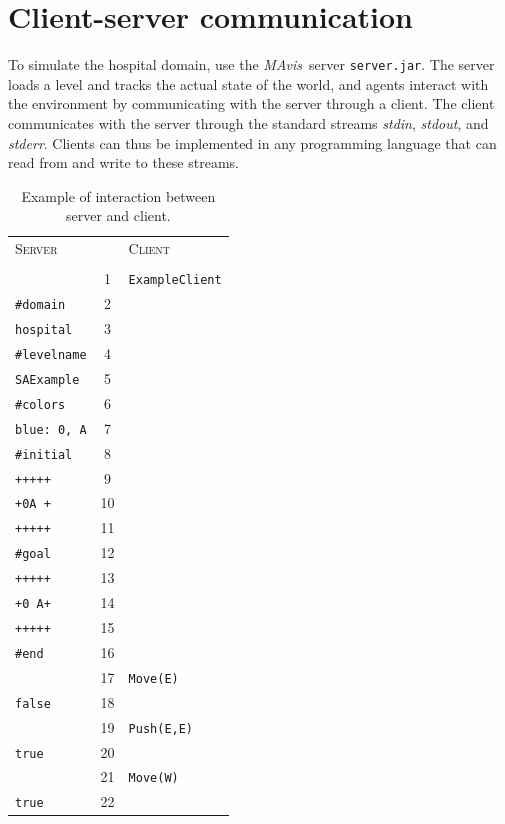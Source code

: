\documentclass[12pt,a4paper]{article}
\def\mavis{{\itshape MAvis}}
\begin{document}
\section{Client-server communication}\label{sect:env}


To simulate the hospital domain, use the \mavis\ server \texttt{server.jar}. The server loads a level and tracks the actual state of the world, and agents interact with the environment by communicating with the server through a client. The client communicates with the server through the standard streams \emph{stdin}, \emph{stdout}, and \emph{stderr}. Clients can thus be implemented in any programming language that can read from and write to these streams.

\begin{table}
\centering \setlength{\tabcolsep}{1cm} 
\begin{tabular}{lcl} 
\textsc{Server} &    & \textsc{Client}\\ \\
& 1 & \texttt{ExampleClient}\\
\texttt{\#domain} & 2 & \\
\texttt{hospital} & 3 & \\
\texttt{\#levelname} & 4 & \\
\texttt{SAExample} & 5 & \\
\texttt{\#colors} & 6 & \\
\texttt{blue: 0, A} & 7 & \\
\texttt{\#initial} & 8 & \\
\texttt{+++++} & 9 & \\
\texttt{+0A +} & 10 & \\
\texttt{+++++} & 11 & \\
\texttt{\#goal} & 12 & \\
\texttt{+++++} & 13 & \\
\texttt{+0 A+} & 14 & \\
\texttt{+++++} & 15 & \\
\texttt{\#end} & 16 & \\
& 17 & \texttt{Move(E)}\\
\texttt{false} & 18 & \\
& 19 & \texttt{Push(E,E)}\\
\texttt{true} & 20 & \\
& 21 & \texttt{Move(W)}\\
\texttt{true} & 22 & \\
\end{tabular}
\caption{Example of interaction between server and client.}
\label{tbl1:protocol_example}
\end{table}
\end{document}
